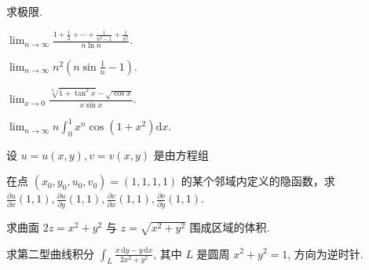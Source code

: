 \par{}
求极限.\par
$\lim_{n\to\infty}\frac{1+\frac{1}{2}+\cdots+\frac{1}{n^{2}-1}+\frac{1}{n^{2}}}{n\ln n}.$\par
$\lim_{n\to\infty}n^{2}\left(n\sin\frac{1}{n}-1\right).$\par
$\lim_{x\to 0}\frac{\sqrt[3]{1 + \tan^2x} - \sqrt{\cos x}}{x\sin x}.$\par
$\lim_{n\to \infty}n\int_0^1 x^n\cos (1 + x^2)\mathrm{d}x.$\par
\par
\par{}
设 $u = u(x, y), v = v(x, y)$ 是由方程组\par
\nopagebreak[4]
在点 $(x_0, y_0, u_0, v_0) = (1, 1, 1, 1)$ 的某个邻域内定义的隐函数，求 $\frac{\partial u}{\partial x}(1, 1), \frac{\partial u}{\partial y}(1, 1), \frac{\partial v}{\partial x}(1, 1), \frac{\partial v}{\partial y}(1, 1)$.\par
求曲面 $2z = x^{2} + y^{2}$ 与 $z = \sqrt{x^2 + y^2}$ 围成区域的体积.\par
求第二型曲线积分 $\int_{L} \frac{x \, \mathrm{d}y - y \, \mathrm{d}x}{2x^{2} + y^{2}}$, 其中 $L$ 是圆周 $x^{2} + y^{2} = 1$, 方向为逆时针.\par
